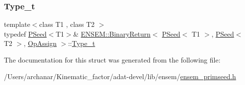 \subsubsection{\texorpdfstring{Type\_t}{Type\_t}\hspace{0.1cm}{\footnotesize\ttfamily [3/3]}}
{\footnotesize\ttfamily template$<$class T1 , class T2 $>$ \\
typedef \mbox{\hyperlink{classENSEM_1_1PSeed}{P\+Seed}}$<$T1$>$\& \mbox{\hyperlink{structENSEM_1_1BinaryReturn}{E\+N\+S\+E\+M\+::\+Binary\+Return}}$<$ \mbox{\hyperlink{classENSEM_1_1PSeed}{P\+Seed}}$<$ T1 $>$, \mbox{\hyperlink{classENSEM_1_1PSeed}{P\+Seed}}$<$ T2 $>$, \mbox{\hyperlink{structENSEM_1_1OpAssign}{Op\+Assign}} $>$\+::\mbox{\hyperlink{structENSEM_1_1BinaryReturn_3_01PSeed_3_01T1_01_4_00_01PSeed_3_01T2_01_4_00_01OpAssign_01_4_a14ba5023d53a2620dfd0bbb617d040c6}{Type\+\_\+t}}}



The documentation for this struct was generated from the following file\+:\begin{DoxyCompactItemize}
\item 
/\+Users/archanar/\+Kinematic\+\_\+factor/adat-\/devel/lib/ensem/\mbox{\hyperlink{adat-devel_2lib_2ensem_2ensem__primseed_8h}{ensem\+\_\+primseed.\+h}}\end{DoxyCompactItemize}
